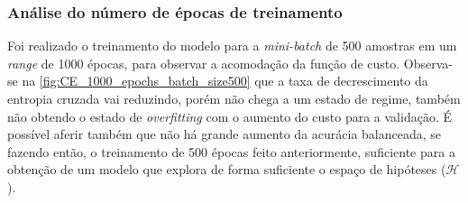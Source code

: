 \subsubsection*{Análise do número de épocas de treinamento}

Foi realizado o treinamento do modelo para a \textit{mini-batch} de 500 amostras em um \textit{range} de 1000 épocas, para observar a acomodação da função de custo. Observa-se na \autoref{fig:CE_1000_epochs_batch_size500} que a taxa de decrescimento da entropia cruzada vai reduzindo, porém não chega a um estado de regime, também não obtendo o estado de \textit{overfitting} com o aumento do custo para a validação. É possível aferir também que não há grande aumento da acurácia balanceada, se fazendo então, o treinamento de 500 épocas feito anteriormente, suficiente para a obtenção de um modelo que explora de forma suficiente o espaço de hipóteses ($\mathcal{H}$).

